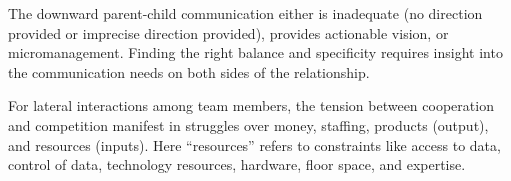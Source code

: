 The downward parent-child communication either is inadequate (no direction provided or imprecise direction provided), provides actionable vision, or micromanagement. Finding the right balance and specificity requires insight into the communication needs on both sides of the relationship. 

For lateral interactions among team members, the tension between cooperation and competition manifest in struggles over money, staffing, products (output), and resources (inputs). Here ``resources''  refers to constraints like access to data, control of data, technology resources, hardware, floor space, and expertise. 


